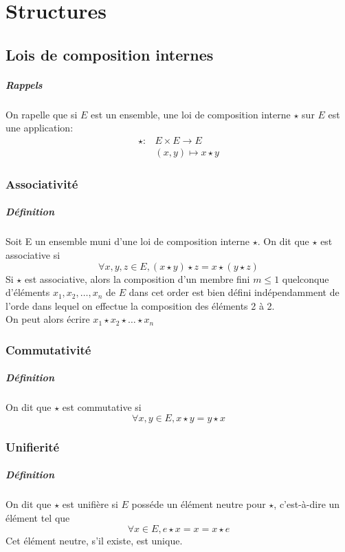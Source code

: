 \chapter{Structures}
\section{Lois de composition internes}
\paragraph{Rappels} On rapelle que si $E$ est un ensemble, une loi de composition interne $\star$ sur $E$ est une application:
\begin{eqnarray*}
\star{}: & E \times E \rightarrow E \\
& (x, y) \mapsto x \star y
\end{eqnarray*}

%
\subsection{Associativité}
%
\paragraph{Définition} Soit E un ensemble muni d'une loi de composition interne $\star$. On dit que $\star$ est associative si
$$ \forall x, y, z \in E, (x \star y) \star z = x \star (y \star z)$$
Si $\star$ est associative, alors la composition d'un membre fini $m \leq 1$ quelconque d'éléments $x_1, x_2, \ldots , x_n$ de $E$ dans cet order est bien défini indépendamment de l'orde dans lequel on effectue la composition des éléments 2 à 2. \\
On peut alors écrire $x_1 \star x_2 \star \ldots \star x_n$

%
\subsection{Commutativité}
%
\paragraph{Définition} On dit que $\star$ est commutative si
$$ \forall x, y \in E, x \star y = y \star x$$

%
\subsection{Unifierité}
%
\paragraph{Définition} On dit que $\star$ est unifière si $E$ posséde un élément neutre pour $\star$, c'est-à-dire un élément tel que
$$ \forall x \in E, e \star x = x = x \star e$$
Cet élément neutre, s'il existe, est unique.

